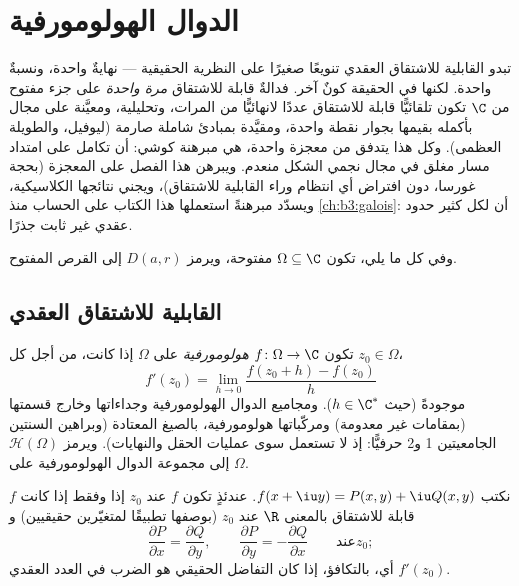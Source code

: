 \chapter{الدوال الهولومورفية}\label{ch:b3:holomorphic}

تبدو القابلية للاشتقاق العقدي تنويعًا صغيرًا على النظرية
الحقيقية --- نهايةٌ واحدة، ونسبةٌ واحدة. لكنها في الحقيقة كونٌ
آخر. فدالةٌ قابلة للاشتقاق \emph{مرة واحدة} على جزء مفتوح من
$\C$ تكون تلقائيًّا قابلة للاشتقاق عددًا لانهائيًّا من المرات،
وتحليلية، ومعيَّنة على مجال بأكمله بقيمها بجوار نقطة واحدة،
ومقيَّدة بمبادئ شاملة صارمة (ليوفيل، والطويلة العظمى). وكل هذا
يتدفق من معجزة واحدة، هي مبرهنة كوشي: أن تكامل 
على امتداد مسار مغلق في مجال نجمي الشكل منعدم. ويبرهن هذا الفصل
على المعجزة (بحجة غورسا، دون افتراض أي انتظام وراء القابلية
للاشتقاق)، ويجني نتائجها الكلاسيكية، ويسدّد مبرهنةً استعملها
هذا الكتاب على الحساب منذ \cref{ch:b3:galois}: أن لكل كثير حدود عقدي غير
ثابت جذرًا.

وفي كل ما يلي، تكون $\Omega \subseteq \C$ مفتوحة، ويرمز $D(a, r)$ إلى القرص
المفتوح.

\section{القابلية للاشتقاق العقدي}

\begin{definition}\label{def:b3:holomorphic:holo}
تكون $f \colon \Omega \to \C$ \emph{هولومورفية} على
$\Omega$ إذا كانت، من أجل كل $z_0 \in \Omega$،
\[
f'(z_0) = \lim_{h\to0}\frac{f(z_0 + h) - f(z_0)}{h}
\]
موجودةً (حيث $h \in \C^*$). ومجاميع الدوال الهولومورفية
وجداءاتها وخارج قسمتها (بمقامات غير معدومة) ومركّباتها
هولومورفية، بالصيغ المعتادة (وبراهين السنتين الجامعيتين 1 و2
حرفيًّا: إذ لا تستعمل سوى عمليات الحقل والنهايات). ويرمز $\mathcal H(\Omega)$
إلى مجموعة الدوال الهولومورفية على $\Omega$.
\end{definition}

\begin{proposition}
\label{prop:b3:holomorphic:cauchyriemann}
نكتب $f(x + \iu y) = P(x,y) + \iu Q(x,y)$. عندئذٍ تكون $f$  عند $z_0$ إذا وفقط إذا
كانت $f$ قابلة للاشتقاق بالمعنى $\R$ عند $z_0$ (بوصفها تطبيقًا
لمتغيّرين حقيقيين) و
\[
\frac{\partial P}{\partial x} = \frac{\partial Q}{\partial y},
\qquad
\frac{\partial P}{\partial y} = -\frac{\partial Q}{\partial x}
\qquad \text{عند} z_0 ;
\]
أي، بالتكافؤ، إذا كان التفاضل الحقيقي هو الضرب في العدد العقدي
$f'(z_0)$.
\end{proposition}


